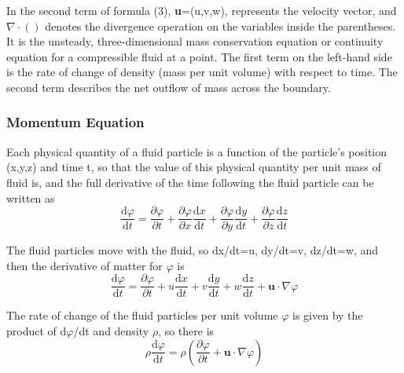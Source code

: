 \documentclass{apmcmthesis}
\begin{document}
In the second term of formula (3), \textbf{u}=(u,v,w), represents the velocity vector, and $\nabla\cdot ()$ denotes the divergence operation on the variables inside the parentheses. It is the unsteady, three-dimensional mass conservation equation or continuity equation for a compressible fluid at a point. The first term on the left-hand side is the rate of change of density (mass per unit volume) with respect to time. The second term describes the net outflow of mass across the boundary.

\subsubsection{Momentum Equation}

Each physical quantity of a fluid particle is a function of the particle's position (x,y,z) and time t, so that the value of this physical quantity per unit mass of fluid is, and the full derivative of the time following the fluid particle can be written as
\begin{equation}
\frac{\mathrm{d} \varphi }{\mathrm{d} t} =\frac{\partial \varphi }{\partial t} +\frac{\partial \varphi }{\partial x}\frac{\mathrm{d} x}{\mathrm{d} t}+ \frac{\partial \varphi }{\partial y}\frac{\mathrm{d} y}{\mathrm{d} t}+\frac{\partial \varphi }{\partial z}\frac{\mathrm{d} z}{\mathrm{d} t} 
\end{equation}

The fluid particles move with the fluid, so dx/dt=u, dy/dt=v, dz/dt=w, and then the derivative of matter for $\varphi$ is 
\begin{equation}
\frac{\mathrm{d} \varphi }{\mathrm{d} t} =\frac{\partial \varphi }{\partial t} +u\frac{\mathrm{d} x}{\mathrm{d} t}+ v\frac{\mathrm{d} y}{\mathrm{d} t}+w\frac{\mathrm{d} z}{\mathrm{d} t}+\textbf{u}\cdot \nabla\varphi 
\end{equation}

The rate of change of the fluid particles per unit volume $\varphi$ is given by the product of d$\varphi$/dt and density $\rho$, so there is
\begin{equation}
\rho \frac{\mathrm{d} \varphi }{\mathrm{d} t} =\rho(\frac{\partial \varphi }{\partial t} +\textbf{u} \cdot \nabla\varphi  )
\end{equation}
\end{document}
